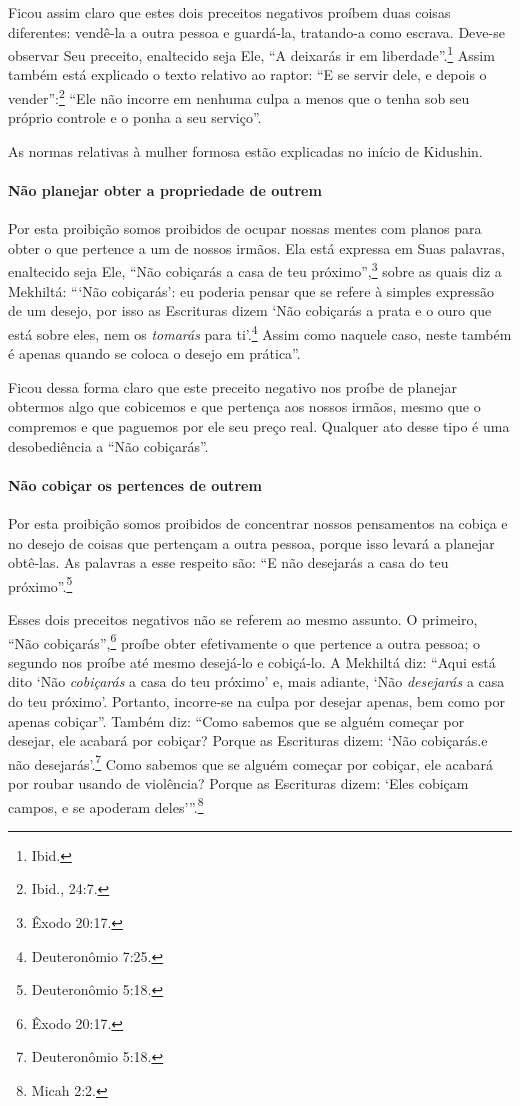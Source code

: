 Ficou assim claro que estes dois preceitos negativos proíbem duas coisas
diferentes: vendê-la a outra pessoa e guardá-la, tratando-a como
escrava. Deve-se observar Seu preceito, enaltecido seja Ele, ``A
deixarás ir em liberdade''.\footnote{Ibid.} Assim também está explicado o texto
relativo ao raptor: ``E se servir dele, e depois o vender'':\footnote{Ibid.,
24:7.} ``Ele não incorre em nenhuma culpa a menos que o tenha sob seu
próprio controle e o ponha a seu serviço''.

As normas relativas à mulher formosa estão explicadas no início de Kidushin.

\paragraph{Não planejar obter a propriedade de outrem}

Por esta proibição somos proibidos de ocupar nossas mentes com planos
para obter o que pertence a um de nossos irmãos. Ela está expressa em
Suas palavras, enaltecido seja Ele, ``Não cobiçarás a casa de teu
próximo'',\footnote{Êxodo 20:17.} sobre as quais diz a Mekhiltá: ```Não
cobiçarás': eu poderia pensar que se refere à simples expressão de um
desejo, por isso as Escrituras dizem `Não cobiçarás a prata e o ouro que
está sobre eles, nem os \emph{tomarás} para ti'.\footnote{Deuteronômio 7:25.}
Assim como naquele caso, neste também é apenas quando se coloca o
desejo em prática''.

Ficou dessa forma claro que este preceito negativo nos proíbe de
planejar obtermos algo que cobicemos e que pertença aos nossos irmãos,
mesmo que o compremos e que paguemos por ele seu preço real. Qualquer
ato desse tipo é uma desobediência a ``Não cobiçarás''.

\paragraph{Não cobiçar os pertences de outrem}

Por esta proibição somos proibidos de concentrar nossos pensamentos na
cobiça e no desejo de coisas que pertençam a outra pessoa, porque isso
levará a planejar obtê-las. As palavras a esse respeito são: ``E não
desejarás a casa do teu próximo''.\footnote{Deuteronômio 5:18.}

Esses dois preceitos negativos não se referem ao mesmo assunto. O
primeiro, ``Não cobiçarás'',\footnote{Êxodo 20:17.} proíbe obter efetivamente o
que pertence a outra pessoa; o segundo nos proíbe até mesmo desejá-lo e
cobiçá-lo. A Mekhiltá diz: ``Aqui está dito `Não \emph{cobiçarás} a casa
do teu próximo' e, mais adiante, `Não \emph{desejarás} a casa do teu
próximo'. Portanto, incorre-se na culpa por desejar apenas, bem como por
apenas cobiçar''. Também diz: ``Como sabemos que se alguém começar por
desejar, ele acabará por cobiçar? Porque as Escrituras dizem: `Não
cobiçarás.e não desejarás'.\footnote{Deuteronômio 5:18.} Como sabemos que se
alguém começar por cobiçar, ele acabará por roubar usando de violência?
Porque as Escrituras dizem: `Eles cobiçam campos, e se apoderam
deles'''.\footnote{Micah 2:2.}

